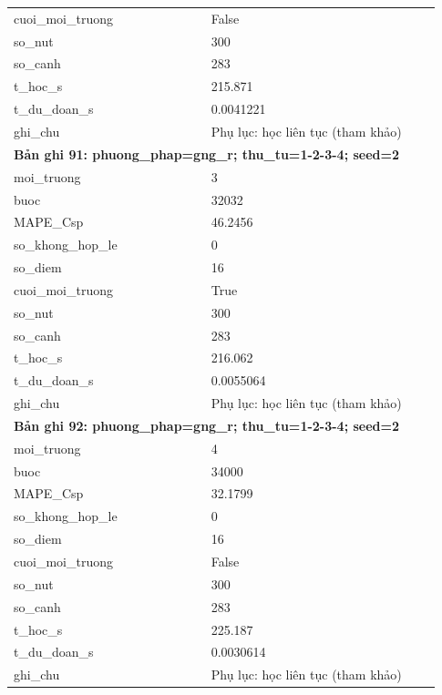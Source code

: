 \begin{longtable}{p{0.43\linewidth}p{0.50\linewidth}}
cuoi\_\allowbreak moi\_\allowbreak truong & False \\
so\_\allowbreak nut & 300 \\
so\_\allowbreak canh & 283 \\
t\_\allowbreak hoc\_\allowbreak s & 215.871 \\
t\_\allowbreak du\_\allowbreak doan\_\allowbreak s & 0.0041221 \\
ghi\_\allowbreak chu & Phụ lục: học liên tục (tham khảo) \\
\midrule
\multicolumn{2}{p{0.95\linewidth}}{\textbf{Bản ghi 91: phuong\_phap=gng\_r; thu\_tu=1-2-3-4; seed=2}} \\
moi\_\allowbreak truong & 3 \\
buoc & 32032 \\
MAPE\_\allowbreak Csp & 46.2456 \\
so\_\allowbreak khong\_\allowbreak hop\_\allowbreak le & 0 \\
so\_\allowbreak diem & 16 \\
cuoi\_\allowbreak moi\_\allowbreak truong & True \\
so\_\allowbreak nut & 300 \\
so\_\allowbreak canh & 283 \\
t\_\allowbreak hoc\_\allowbreak s & 216.062 \\
t\_\allowbreak du\_\allowbreak doan\_\allowbreak s & 0.0055064 \\
ghi\_\allowbreak chu & Phụ lục: học liên tục (tham khảo) \\
\midrule
\multicolumn{2}{p{0.95\linewidth}}{\textbf{Bản ghi 92: phuong\_phap=gng\_r; thu\_tu=1-2-3-4; seed=2}} \\
moi\_\allowbreak truong & 4 \\
buoc & 34000 \\
MAPE\_\allowbreak Csp & 32.1799 \\
so\_\allowbreak khong\_\allowbreak hop\_\allowbreak le & 0 \\
so\_\allowbreak diem & 16 \\
cuoi\_\allowbreak moi\_\allowbreak truong & False \\
so\_\allowbreak nut & 300 \\
so\_\allowbreak canh & 283 \\
t\_\allowbreak hoc\_\allowbreak s & 225.187 \\
t\_\allowbreak du\_\allowbreak doan\_\allowbreak s & 0.0030614 \\
ghi\_\allowbreak chu & Phụ lục: học liên tục (tham khảo) \\

\end{longtable}
